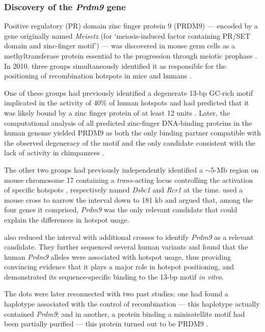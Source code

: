 \subsubsection{Discovery of the \textit{Prdm9} gene}
Positive regulatory (PR) domain zinc finger protein 9 (PRDM9) — encoded by a gene originally named \textit{Meisetz} (for ‘meiosis-induced factor containing PR/SET domain and zinc-finger motif’) — was discovered in mouse germ cells as a methyltransferase protein essential to the progression through meiotic prophase \citep{hayashi2005histone,hayashi2006meisetz}.
In 2010, three groups simultaneously identified it as responsible for the positioning of recombination hotspots in mice and humans \citep[reviewed in \citealp{cheung2010genetic} and \citealp{hochwagen2010meiosis}]{baudat2010prdm9,myers2010drive,parvanov2010prdm9}.

One of these groups had previously identified a degenerate 13-bp GC-rich motif \citep{myers2005finescale} implicated in the activity of 40\% of human hotspots \citep{myers2008common,webb2008sperm} and had predicted that it was likely bound by a zinc finger protein of at least 12 units \citep{myers2008common}.
Later, the computational analysis of all predicted zinc-finger DNA-binding proteins in the human genome yielded PRDM9 as both the only binding partner compatible with the observed degeneracy of the motif and the only candidate consistent with the lack of activity in chimpanzees \citep{myers2010drive}.

The other two groups had previously independently identified a $\sim$5-Mb region on mouse chromosome 17 containing a \textit{trans-}acting locus controlling the activation of specific hotspots \citep{grey2009genomewide,parvanov2009transregulation}, respectively named \textit{Dsbc1} and \textit{Rcr1} at the time.
\citet{parvanov2010prdm9} used a mouse cross to narrow the interval down to 181 kb and argued that, among the four genes it comprised, \textit{Prdm9} was the only relevant candidate that could explain the differences in hotspot usage.

\citet{baudat2010prdm9} also reduced the interval with additional crosses to identify \textit{Prdm9} as a relevant candidate. 
They further sequenced several human variants and found that the human \textit{Prdm9} alleles were associated with hotspot usage, thus providing convincing evidence that it plays a major role in hotspot positioning, and demonstrated its sequence-specific binding to the 13-bp motif \textit{in vitro}.

The dots were later reconnected with two past studies: one had found a haplotype associated with the control of recombination \citep{shiroishi1982new} — this haplotype actually contained \textit{Prdm9}; and in another, a protein binding a minisatellite motif had been partially purified \citep{wahls1991two} — this protein turned out to be PRDM9 \citep{wahls2011dna}.\\

